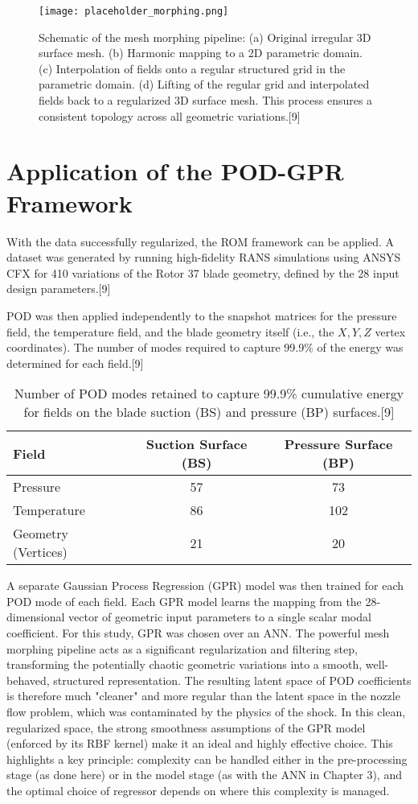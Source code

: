 \documentclass[12pt, a4paper]{report}
\begin{document}
\begin{figure}[htbp]
    \centering
    \texttt{[image: placeholder\_morphing.png]}
    \caption{Schematic of the mesh morphing pipeline: (a) Original irregular 3D surface mesh. (b) Harmonic mapping to a 2D parametric domain. (c) Interpolation of fields onto a regular structured grid in the parametric domain. (d) Lifting of the regular grid and interpolated fields back to a regularized 3D surface mesh. This process ensures a consistent topology across all geometric variations.[9]}
    \label{fig:morphing}
\end{figure}

\section{Application of the POD-GPR Framework}
With the data successfully regularized, the ROM framework can be applied. A dataset was generated by running high-fidelity RANS simulations using ANSYS CFX for 410 variations of the Rotor 37 blade geometry, defined by the 28 input design parameters.[9]

POD was then applied independently to the snapshot matrices for the pressure field, the temperature field, and the blade geometry itself (i.e., the $X, Y, Z$ vertex coordinates). The number of modes required to capture 99.9\% of the energy was determined for each field.[9]

\begin{table}[htbp]
\centering
\caption{Number of POD modes retained to capture 99.9\% cumulative energy for fields on the blade suction (BS) and pressure (BP) surfaces.[9]}
\label{tab:rotor_pod}
\begin{tabular}{@{}lcc@{}}
\toprule
Field & Suction Surface (BS) & Pressure Surface (BP) \\
\midrule
Pressure & 57 & 73 \\
Temperature & 86 & 102 \\
Geometry (Vertices) & 21 & 20 \\
\bottomrule
\end{tabular}
\end{table}

A separate Gaussian Process Regression (GPR) model was then trained for each POD mode of each field. Each GPR model learns the mapping from the 28-dimensional vector of geometric input parameters to a single scalar modal coefficient. For this study, GPR was chosen over an ANN. The powerful mesh morphing pipeline acts as a significant regularization and filtering step, transforming the potentially chaotic geometric variations into a smooth, well-behaved, structured representation. The resulting latent space of POD coefficients is therefore much "cleaner" and more regular than the latent space in the nozzle flow problem, which was contaminated by the physics of the shock. In this clean, regularized space, the strong smoothness assumptions of the GPR model (enforced by its RBF kernel) make it an ideal and highly effective choice. This highlights a key principle: complexity can be handled either in the pre-processing stage (as done here) or in the model stage (as with the ANN in Chapter 3), and the optimal choice of regressor depends on where this complexity is managed.
\end{document}
